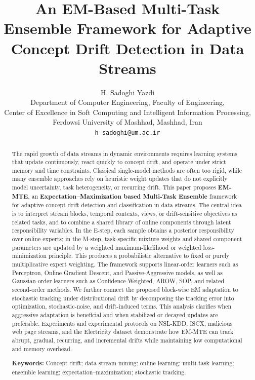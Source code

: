 ﻿\documentclass[12pt,a4paper]{article}
\title{\textbf{An EM-Based Multi-Task Ensemble Framework for Adaptive Concept Drift Detection in Data Streams}}
\author{H. Sadoghi Yazdi\\
Department of Computer Engineering, Faculty of Engineering,\\
Center of Excellence in Soft Computing and Intelligent Information Processing,\\
Ferdowsi University of Mashhad, Mashhad, Iran\\
\texttt{h-sadoghi@um.ac.ir}}
\date{}
\begin{document}
\maketitle

\begin{abstract}
The rapid growth of data streams in dynamic environments requires learning systems that update continuously, react quickly to concept drift, and operate under strict memory and time constraints. Classical single-model methods are often too rigid, while many ensemble approaches rely on heuristic weight updates that do not explicitly model uncertainty, task heterogeneity, or recurring drift. This paper proposes \textbf{EM-MTE}, an \textbf{Expectation--Maximization based Multi-Task Ensemble} framework for adaptive concept drift detection and classification in data streams. The central idea is to interpret stream blocks, temporal contexts, views, or drift-sensitive objectives as related tasks, and to combine a shared library of online components through latent responsibility variables. In the E-step, each sample obtains a posterior responsibility over online experts; in the M-step, task-specific mixture weights and shared component parameters are updated by a weighted maximum-likelihood or weighted loss-minimization principle. This produces a probabilistic alternative to fixed or purely multiplicative expert weighting. The framework supports linear-order learners such as Perceptron, Online Gradient Descent, and Passive-Aggressive models, as well as Gaussian-order learners such as Confidence-Weighted, AROW, SOP, and related second-order methods. We further connect the proposed block-wise EM adaptation to stochastic tracking under distributional drift by decomposing the tracking error into optimization, stochastic-noise, and drift-induced terms. This analysis clarifies when aggressive adaptation is beneficial and when stabilized or decayed updates are preferable. Experiments and experimental protocols on NSL-KDD, ISCX, malicious web page streams, and the Electricity dataset demonstrate how EM-MTE can track abrupt, gradual, recurring, and incremental drifts while maintaining low computational and memory overhead.

\medskip
\noindent\textbf{Keywords:} Concept drift; data stream mining; online learning; multi-task learning; ensemble learning; expectation--maximization; stochastic tracking.
\end{abstract}

\end{document}
